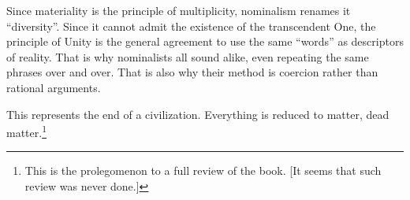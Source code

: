 Since materiality is the principle of multiplicity, nominalism renames it ``diversity''. Since it cannot admit the existence of the transcendent One, the principle of Unity is the general agreement to use the same ``words'' as descriptors of reality. That is why nominalists all sound alike, even repeating the same phrases over and over. That is also why their method is coercion rather than rational arguments.

This represents the end of a civilization. Everything is reduced to matter, dead matter.\footnote{This is the prolegomenon to a full review of the book. [It seems that such review was never done.]}


